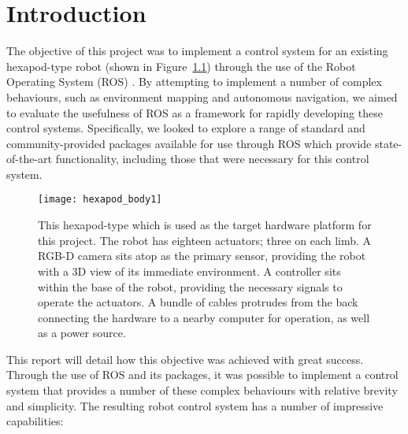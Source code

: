 \chapter{Introduction}


The objective of this project was to implement a control system for an existing hexapod-type robot (shown in Figure~\ref{fig:hexapod}) through the use of the Robot Operating System (ROS) \cite{ros_site}. By attempting to implement a number of complex behaviours, such as environment mapping and autonomous navigation, we aimed to evaluate the usefulness of ROS as a framework for rapidly developing these control systems. Specifically, we looked to explore a range of standard and community-provided packages available for use through ROS which provide state-of-the-art functionality, including those that were necessary for this control system.

\begin{figure}[t]
    \centering
    \texttt{[image: hexapod\_body1]}
    \caption{This hexapod-type which is used as the target hardware platform for this project. The robot has eighteen actuators; three on each limb. A RGB-D camera sits atop as the primary sensor, providing the robot with a 3D view of its immediate environment. A controller sits within the base of the robot, providing the necessary signals to operate the actuators. A bundle of cables protrudes from the back connecting the hardware to a nearby computer for operation, as well as a power source.}
    \label{fig:hexapod}
\end{figure}

This report will detail how this objective was achieved with great success. Through the use of ROS and its packages, it was possible to implement a control system that provides a number of these complex behaviours with relative brevity and simplicity. The resulting robot control system has a number of impressive capabilities:

